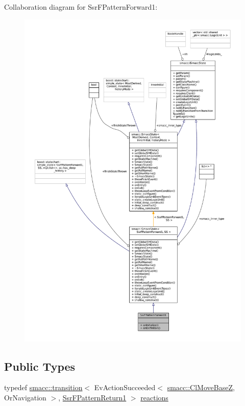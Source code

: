 Collaboration diagram for Ssr\+F\+Pattern\+Forward1\+:
\nopagebreak
\begin{figure}[H]
\begin{center}
\leavevmode
\includegraphics[width=350pt]{structSsrFPatternForward1__coll__graph}
\end{center}
\end{figure}
\subsection*{Public Types}
\begin{DoxyCompactItemize}
\item 
typedef \hyperlink{classsmacc_1_1transition}{smacc\+::transition}$<$ Ev\+Action\+Succeeded$<$ \hyperlink{classsmacc_1_1ClMoveBaseZ}{smacc\+::\+Cl\+Move\+BaseZ}, Or\+Navigation $>$, \hyperlink{structSsrFPatternReturn1}{Ssr\+F\+Pattern\+Return1} $>$ \hyperlink{structSsrFPatternForward1_a69ca2877827b56eebce83cce2140a4ea}{reactions}
\end{DoxyCompactItemize}

